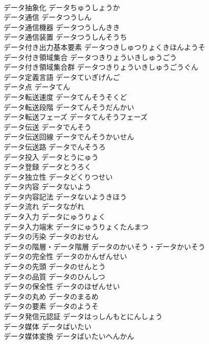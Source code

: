 \documentclass[8pt]{extreport}
\begin{document}
\begin{CJK}{UTF8}{min}
\\	データ抽象化	データちゅうしょうか	
\\	データ通信	データつうしん	
\\	データ通信機器	データつうしんきき	
\\	データ通信装置	データつうしんそうち	
\\	データ付き出力基本要素	データつきしゅつりょくきほんようそ	
\\	データ付き領域集合	データつきりょういきしゅうごう	
\\	データ付き領域集合群	データつきりょういきしゅうごうぐん	
\\	データ定義言語	データていぎげんご	
\\	データ点	データてん	
\\	データ転送速度	データてんそうそくど	
\\	データ転送段階	データてんそうだんかい	
\\	データ転送フェーズ	データてんそうフェーズ	
\\	データ伝送	データでんそう	
\\	データ伝送回線	データでんそうかいせん	
\\	データ伝送路	データでんそうろ	
\\	データ投入	データとうにゅう	
\\	データ登録	データとうろく	
\\	データ独立性	データどくりつせい	
\\	データ内容	データないよう	
\\	データ内容記法	データないようきほう	
\\	データ流れ	データながれ	
\\	データ入力	データにゅうりょく	
\\	データ入力端末	データにゅうりょくたんまつ	
\\	データの汚染	データのおせん	
\\	データの階層・データ階層	データのかいそう・データかいそう	
\\	データの完全性	データのかんぜんせい	
\\	データの先頭	データのせんとう	
\\	データの品質	データのひんしつ	
\\	データの保全性	データのほぜんせい	
\\	データの丸め	データのまるめ	
\\	データの要素	データのようそ	
\\	データ発信元認証	データはっしんもとにんしょう	
\\	データ媒体	データばいたい	
\\	データ媒体変換	データばいたいへんかん	

\end{CJK}
\end{document}
